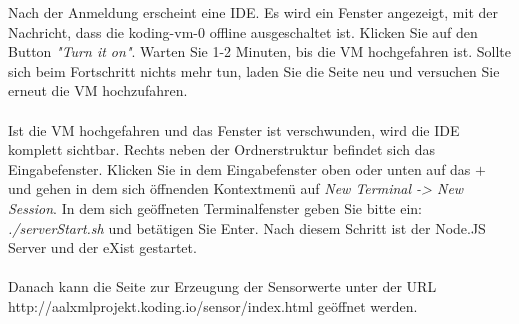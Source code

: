 Nach der Anmeldung erscheint eine IDE. Es wird ein Fenster angezeigt, mit der Nachricht, dass die koding-vm-0 offline ausgeschaltet ist. Klicken Sie auf den Button \textit{"Turn it on"}. Warten Sie 1-2 Minuten, bis die VM hochgefahren ist. Sollte sich beim Fortschritt nichts mehr tun, laden Sie die Seite neu und versuchen Sie erneut die VM hochzufahren.
\\
\\
Ist die VM hochgefahren und das Fenster ist verschwunden, wird die IDE komplett sichtbar. Rechts neben der Ordnerstruktur befindet sich das Eingabefenster. Klicken Sie in dem Eingabefenster oben oder unten auf das $+$ und gehen in dem sich öffnenden Kontextmenü auf \textit{New Terminal -> New Session}. In dem sich geöffneten Terminalfenster geben Sie bitte ein: \textit{./serverStart.sh} und betätigen Sie Enter. Nach diesem Schritt ist der Node.JS Server und der eXist gestartet.
\\
\\
Danach kann die Seite zur Erzeugung der Sensorwerte unter der URL http://aalxmlprojekt.koding.io/sensor/index.html geöffnet werden.